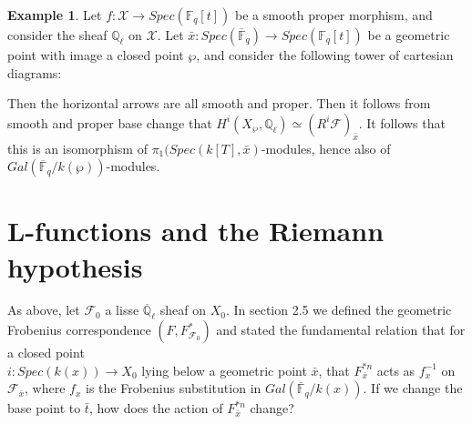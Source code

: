 \documentclass{ucbthesis}
\theoremstyle{definition}
\newtheorem{exm}[thm]{Example}
\theoremstyle{theorem}
\begin{document}
\begin{exm}
Let $f:\mathcal{X} \rightarrow Spec(\mathbb{F}_{q}[t])$ be a smooth proper morphism, and consider the sheaf $\mathbb{Q}_{\ell}$ on $\mathcal{X}$. Let $\bar{x}:Spec(\overline{\mathbb{F}}_{q}) \rightarrow Spec(\mathbb{F}_{q}[t])$ be a geometric point with image a closed point $\wp$, and consider the following tower of cartesian diagrams:

\begin{center}
\end{center}
Then the horizontal arrows are all smooth and proper. Then it follows from smooth and proper base change that 
$H^{i}(X_{\wp},\mathbb{Q}_{\ell}) \simeq (R^{i}\mathcal{F})_{\bar{x}}$. It follows that this is an isomorphism of $\pi_{1}(Spec(k[T],\bar{x})$-modules, hence also of $Gal(\overline{\mathbb{F}}_{q}/k(\wp))$-modules.
\end{exm}

\section{L-functions and the Riemann hypothesis}
As above, let $\mathcal{F}_0$ a lisse $\overline{\mathbb{Q}}_{\ell}$ sheaf on $X_0$. In section 2.5 we defined the geometric Frobenius correspondence $(F,F_{\mathcal{F}_0}^{*})$ and stated the fundamental relation that for a closed point \\ $i:Spec(k(x)) \rightarrow X_{0}$ lying below a geometric point $\bar{x}$,
 that $F^{*n}_{\bar{x}}$ acts as $f_{x}^{-1}$ on $\mathcal{F}_{\bar{x}}$, where $f_{x}$ is the Frobenius substitution in $Gal(\overline{\mathbb{F}}_{q}/k(x))$. If we change the base point to $\bar{t}$, how does the action of $F_{\bar{x}}^{*n}$ change?
\end{document}
